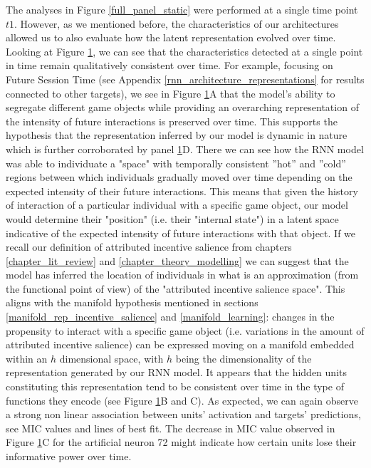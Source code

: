 \begin{figure}[ht]
\label{full_panel_temporal}
\end{figure}

The analyses in Figure \ref{full_panel_static} were performed at a single time point $t1$. However, as we mentioned before, the characteristics of our architectures allowed us to also evaluate how the latent representation evolved over time. Looking at Figure \ref{full_panel_temporal}, we can see that the characteristics detected at a single point in time remain qualitatively consistent over time. For example, focusing on Future Session Time (see Appendix \ref{rnn_architecture_representations} for results connected to other targets), we see in Figure \ref{full_panel_temporal}A that the model's ability to segregate different game objects while providing an  overarching representation of the intensity of future interactions is preserved over time. This supports the hypothesis that the representation inferred by our model is dynamic in nature which is further corroborated by panel \ref{full_panel_temporal}D. There we can see how the RNN model was able to individuate a "space" with temporally consistent ”hot” and ”cold” regions between which individuals gradually moved over time depending on the expected intensity of their future interactions. This means that given the history of interaction of a particular individual with a specific game object, our model would determine their "position" (i.e. their "internal state") in a latent space indicative of the expected intensity of future interactions with that object. If we recall our definition of attributed incentive salience from chapters \ref{chapter_lit_review} and \ref{chapter_theory_modelling} we can suggest that the model has inferred the location of individuals in what is an approximation (from the functional point of view) of the "attributed incentive salience space". This aligns with the manifold hypothesis mentioned in sections \ref{manifold_rep_incentive_salience} and \ref{manifold_learning}: changes in the propensity to interact with a specific game object (i.e. variations in the amount of attributed incentive salience) can be expressed moving on a manifold embedded within an $h$ dimensional space, with $h$ being the dimensionality of the representation generated by our RNN model. It appears that the hidden units constituting this representation tend to be consistent over time in the type of functions they encode (see Figure \ref{full_panel_temporal}B and C). As expected, we can again observe a strong non linear association between units' activation and targets' predictions, see MIC values and lines of best fit. The decrease in MIC value observed in Figure \ref{full_panel_temporal}C for the artificial neuron 72 might indicate how certain units lose their informative power over time.


